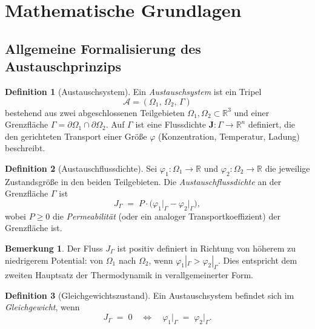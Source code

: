 ﻿\documentclass[a4paper,12pt]{article}
\theoremstyle{definition}
\newtheorem{definition}{Definition}
\newtheorem{bemerkung}{Bemerkung}
\begin{document}
\section{Mathematische Grundlagen}

\subsection{Allgemeine Formalisierung des Austauschprinzips}

\begin{definition}[Austauschsystem]
    Ein \emph{Austauschsystem} ist ein Tripel
    \[
        \mathcal{A} = (\Omega_1,\, \Omega_2,\, \Gamma)
    \]
    bestehend aus zwei abgeschlossenen Teilgebieten $\Omega_1, \Omega_2 \subset \mathbb{R}^3$
    und einer Grenzfläche $\Gamma = \partial\Omega_1 \cap \partial\Omega_2$.
    Auf $\Gamma$ ist eine Flussdichte $\mathbf{J}: \Gamma \to \mathbb{R}^n$ definiert,
    die den gerichteten Transport einer Größe $\varphi$ (Konzentration, Temperatur, Ladung)
    beschreibt.
\end{definition}

\begin{definition}[Austauschflussdichte]
    Sei $\varphi_1: \Omega_1 \to \mathbb{R}$ und $\varphi_2: \Omega_2 \to \mathbb{R}$
    die jeweilige Zustandsgröße in den beiden Teilgebieten.
    Die \emph{Austauschflussdichte} an der Grenzfläche $\Gamma$ ist
    \[
        J_{\Gamma} \;=\; P \cdot \bigl(\varphi_1\big|_{\Gamma} - \varphi_2\big|_{\Gamma}\bigr),
    \]
    wobei $P \geq 0$ die \emph{Permeabilität} (oder ein analoger Transportkoeffizient)
    der Grenzfläche ist.
\end{definition}

\begin{bemerkung}
    Der Fluss $J_\Gamma$ ist positiv definiert in Richtung von höherem zu niedrigerem
    Potential: von $\Omega_1$ nach $\Omega_2$, wenn $\varphi_1|_\Gamma > \varphi_2|_\Gamma$.
    Dies entspricht dem zweiten Hauptsatz der Thermodynamik in verallgemeinerter Form.
\end{bemerkung}

\begin{definition}[Gleichgewichtszustand]
    Ein Austauschsystem befindet sich im \emph{Gleichgewicht}, wenn
    \[
        J_\Gamma \;=\; 0 \quad \Longleftrightarrow \quad \varphi_1\big|_\Gamma \;=\; \varphi_2\big|_\Gamma.
    \]
\end{definition}
\end{document}
